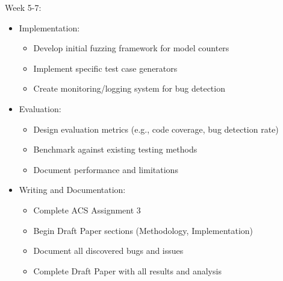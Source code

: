 \documentclass[english, a4paper]{article}
\begin{document}
Week 5-7:
\begin{itemize}
    \item Implementation:
    \begin{itemize}
        \item Develop initial fuzzing framework for model counters
        \item Implement specific test case generators
        \item Create monitoring/logging system for bug detection
    \end{itemize}
    
    \item Evaluation:
    \begin{itemize}
        \item Design evaluation metrics (e.g., code coverage, bug detection rate)
        \item Benchmark against existing testing methods
        \item Document performance and limitations
    \end{itemize}
    
    \item Writing and Documentation:
    \begin{itemize}
        \item Complete ACS Assignment 3
        \item Begin Draft Paper sections (Methodology, Implementation)
        \item Document all discovered bugs and issues
        \item Complete Draft Paper with all results and analysis
    \end{itemize}
\end{itemize}
\end{document}
